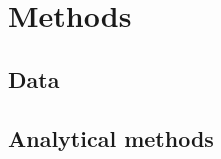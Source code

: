 \documentclass{article}
\begin{document}


\section{Methods}\label{sec:methods}

\subsection{Data}\label{sec:data}






\subsection{Analytical methods}\label{sec:analytical_methods}

\end{document}

